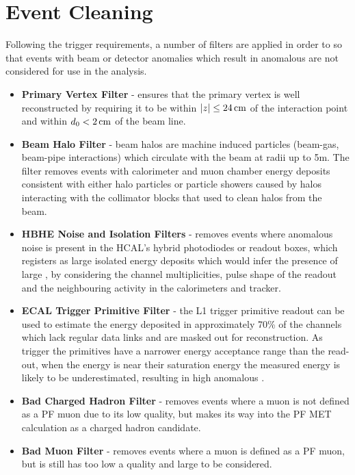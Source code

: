\section{Event Cleaning}\label{sec:metFilters}
Following the trigger requirements, a number of filters are applied in order to so that events with beam or detector anomalies which result in anomalous \MET are not considered for use in the analysis.

\begin{itemize}
\item \textbf{Primary Vertex Filter} - ensures that the primary vertex is well reconstructed by requiring it to be within $|z| \leq 24\,\text{cm}$ of the interaction point and within $d_{0} < 2\,\text{cm}$ of the beam line.
\item \textbf{Beam Halo Filter} - beam halos are machine induced particles (\eg beam-gas, beam-pipe interactions) which circulate with the beam at radii up to 5m. The filter removes events with calorimeter and muon chamber energy deposits consistent with either halo particles or particle showers caused by halos interacting with the collimator blocks that used to clean halos from the beam.
\item \textbf{HBHE Noise and Isolation Filters} - removes events where anomalous noise is present in the HCAL's hybrid photodiodes or readout boxes, which registers as large isolated energy deposits which would infer the presence of large \MET, by considering the channel multiplicities, pulse shape of the readout and the neighbouring activity in the calorimeters and tracker.
\item \textbf{ECAL Trigger Primitive Filter} - the L1 trigger primitive readout can be used to estimate the energy deposited in approximately 70\% of the channels which lack regular data links and are masked out for reconstruction. As trigger the primitives have a narrower energy acceptance range than the read-out, when the energy is near their saturation energy the measured energy is likely to be underestimated, resulting in high anomalous \MET. 
\item \textbf{Bad Charged Hadron Filter} - removes events where a muon is not defined as a PF muon due to its low quality, but makes its way into the PF MET calculation as a charged hadron candidate.
\item \textbf{Bad Muon Filter} - removes events where a muon is defined as a PF muon, but is still has too low a quality and large \pT to be considered.
\end{itemize}


